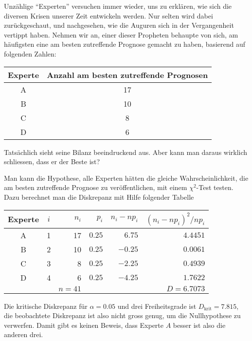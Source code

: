 Unzählige ``Experten'' versuchen immer wieder, uns zu erklären,
wie sich die diversen Krisen unserer Zeit entwickeln werden. Nur
selten wird dabei zurückgeschaut, und nachgesehen, wie die Auguren
sich in der Vergangenheit vertippt haben. Nehmen wir an, einer
dieser Propheten behaupte von sich, am häufigsten eine am besten
zutreffende
Prognose gemacht zu haben, basierend auf folgenden Zahlen:
\begin{center}
\begin{tabular}{cc}
\hline
Experte&Anzahl am besten zutreffende Prognosen\\
\hline
A&17\\
B&10\\
C&8\\
D&6\\
\hline
\end{tabular}
\end{center}
Tatsächlich sieht seine Bilanz beeindruckend aus. Aber
kann man daraus wirklich schliessen, dass er der Beste ist?



\begin{loesung}
Man kann die Hypothese, alle Experten hätten die gleiche Wahrscheinlichkeit,
die am besten zutreffende Prognose zu veröffentlichen, mit einem $\chi^2$-Test
testen. Dazu berechnet man die Diskrepanz mit Hilfe folgender Tabelle
\begin{center}
\begin{tabular}{|c|crrrr|}
\hline
Experte&
$i$& $n_i$& $p_i$&$n_i-np_i$&$(n_i-np_i)^2/np_i$\\
\hline
A&  1&    17&$0.25$&$6.75$ &$4.4451$\\
B&  2&    10&$0.25$&$-0.25$&$0.0061$\\
C&  3&     8&$0.25$&$-2.25$&$0.4939$\\
D&  4&     6&$0.25$&$-4.25$&$1.7622$\\
\hline
 &   &$n=41$&      &      &$D=6.7073$\\
\hline
\end{tabular}
\end{center}
Die kritische Diskrepanz für $\alpha=0.05$ und drei Freiheitsgrade ist
$D_{\text{krit}}=7.815$, die beobachtete Diskrepanz ist also nicht
gross genug, um die Nullhypothese zu verwerfen. Damit gibt es keinen
Beweis, dass Experte $A$ besser ist also die anderen drei.
\end{loesung}

